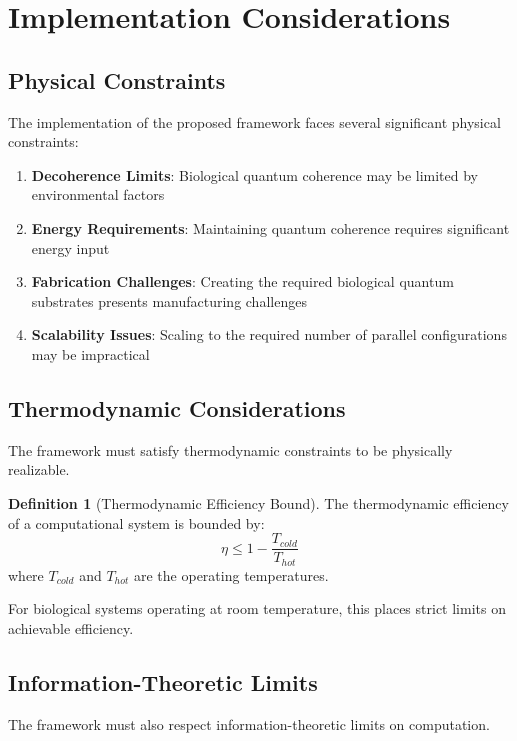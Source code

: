 \documentclass[12pt,a4paper]{article}
\theoremstyle{definition}
\newtheorem{definition}{Definition}[section]
\begin{document}
{\section{Implementation Considerations}

\subsection{Physical Constraints}

The implementation of the proposed framework faces several significant physical constraints:

\begin{enumerate}
\item \textbf{Decoherence Limits}: Biological quantum coherence may be limited by environmental factors
\item \textbf{Energy Requirements}: Maintaining quantum coherence requires significant energy input
\item \textbf{Fabrication Challenges}: Creating the required biological quantum substrates presents manufacturing challenges
\item \textbf{Scalability Issues}: Scaling to the required number of parallel configurations may be impractical
\end{enumerate}

\subsection{Thermodynamic Considerations}

The framework must satisfy thermodynamic constraints to be physically realizable.

\begin{definition}[Thermodynamic Efficiency Bound]
The thermodynamic efficiency of a computational system is bounded by:
\begin{equation}
\eta \leq 1 - \frac{T_{cold}}{T_{hot}}
\end{equation}
where $T_{cold}$ and $T_{hot}$ are the operating temperatures.
\end{definition}

For biological systems operating at room temperature, this places strict limits on achievable efficiency.

\subsection{Information-Theoretic Limits}

The framework must also respect information-theoretic limits on computation.

}
\end{document}
